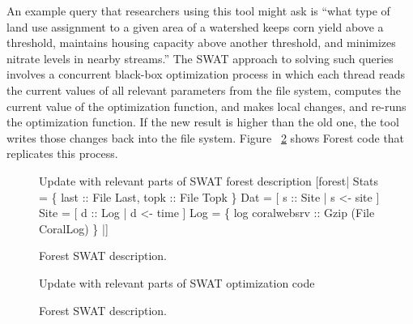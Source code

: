 An example query that researchers using this tool might ask is
``what type of land use assignment to a given area of a watershed
keeps corn yield above a threshold, maintains housing capacity above
another threshold, and minimizes nitrate levels in nearby streams.''
The SWAT approach to solving such queries involves a concurrent black-box
optimization process in which each thread reads the current values of
all relevant parameters from the file system, computes the current
value of the optimization function, and makes local changes, and re-runs
the optimization function. If the new result is higher than the old
one, the tool writes those changes back into the file system.  Figure
~\ref{fig:SWAT-opt-code} shows Forest code that replicates this process.

\begin{figure}
\begin{code}
Update with relevant parts of SWAT forest description    
[forest|
  Stats = 
   \{ last :: File Last, topk :: File Topk \}
  Dat   = [ s :: Site | s <-  site ]
  Site  = [ d :: Log  | d <-  time ]
  Log = 
   \{ log  coralwebsrv :: Gzip (File CoralLog) \} |]
\end{code}
\caption{Forest SWAT description. }
\label{fig:SWAT-description}
\end{figure}

\begin{figure}
\begin{code}
Update with relevant parts of SWAT optimization code
\end{code}
\caption{Forest SWAT description. }
\label{fig:SWAT-opt-code}
\end{figure}



